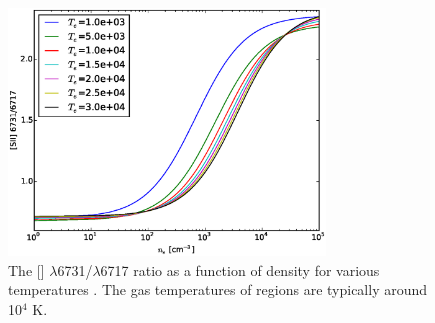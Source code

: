\begin{figure}
    \includegraphics[width=0.75\textwidth]{Images/Appendix/[SII]}
    \caption[{[] ratio as a function of density}]{The [] 
    $\lambda$6731/$\lambda$6717 ratio as a function of density for various 
    temperatures \citep{Luridiana15}.  The gas temperatures of  
    regions are typically around 10$^4$ K.}
    \label{fig:SII_den}
\end{figure}